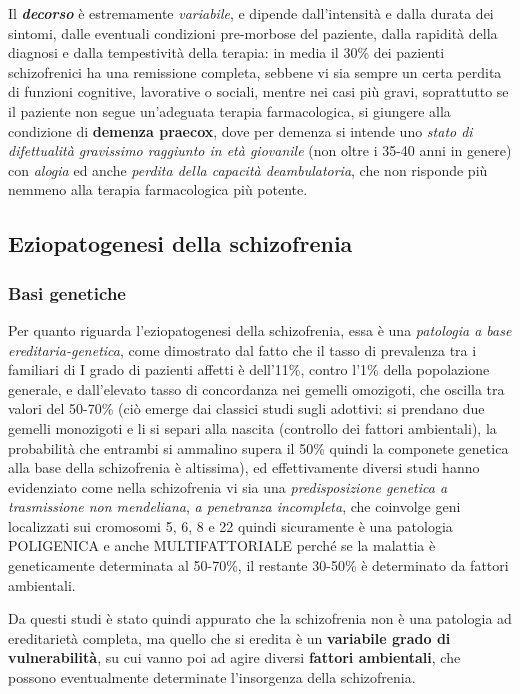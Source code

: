 Il \textbf{\emph{decorso}} è estremamente \emph{variabile}, e dipende
dall'intensità e dalla durata dei sintomi, dalle eventuali condizioni
pre-morbose del paziente, dalla rapidità della diagnosi e dalla
tempestività della terapia: in media il 30\% dei pazienti schizofrenici
ha una remissione completa, sebbene vi sia sempre un certa perdita di
funzioni cognitive, lavorative o sociali, mentre nei casi più gravi,
soprattutto se il paziente non segue un'adeguata terapia farmacologica,
si giungere alla condizione di \textbf{demenza praecox}, dove per
demenza si intende uno \emph{stato di difettualità gravissimo raggiunto
in età giovanile} (non oltre i 35-40 anni in genere) con \emph{alogia}
ed anche \emph{perdita della capacità deambulatoria}, che non risponde
più nemmeno alla terapia farmacologica più potente.

\subsection{Eziopatogenesi della schizofrenia}

\subsubsection{Basi genetiche}
Per quanto riguarda l'eziopatogenesi della schizofrenia, essa è una
\emph{patologia a base ereditaria-genetica}, come dimostrato dal fatto
che il tasso di prevalenza tra i familiari di I grado di pazienti
affetti è dell'11\%, contro l'1\% della popolazione generale, e
dall'elevato tasso di concordanza nei gemelli omozigoti, che oscilla tra
valori del 50-70\% (ciò emerge dai classici studi sugli adottivi: si
prendano due gemelli monozigoti e li si separi alla nascita (controllo
dei fattori ambientali), la probabilità che entrambi si ammalino supera
il 50\% quindi la componete genetica alla base della schizofrenia è
altissima), ed effettivamente diversi studi hanno evidenziato come nella
schizofrenia vi sia una \emph{predisposizione genetica a trasmissione
non mendeliana}, \emph{a penetranza incompleta}, che coinvolge geni
localizzati sui cromosomi 5, 6, 8 e 22 quindi sicuramente è una
patologia POLIGENICA e anche MULTIFATTORIALE perché se la malattia è
geneticamente determinata al 50-70\%, il restante 30-50\% è determinato
da fattori ambientali.

Da questi studi è stato quindi appurato che la schizofrenia non è una
patologia ad ereditarietà completa, ma quello che si eredita è un
\textbf{variabile grado di vulnerabilità}, su cui vanno poi ad agire
diversi \textbf{fattori ambientali}, che possono eventualmente
determinate l'insorgenza della schizofrenia.


